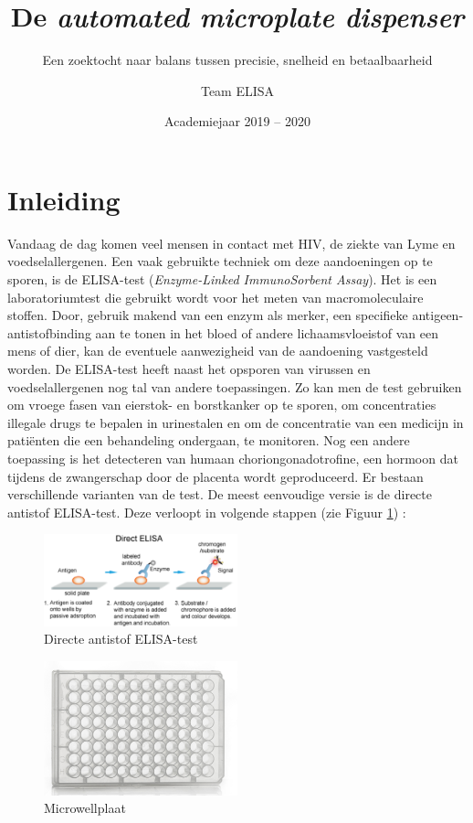 \documentclass[a4paper,twoside,kulak]{kulakreport} %
\title{De \textit{automated microplate dispenser}}
\subtitle{Een zoektocht naar balans tussen precisie, snelheid en betaalbaarheid}
\author{Team ELISA}
\institute{Matthias Derez, Maxime Dujardin, Korneel Verkens, Seppe Vilain}
\date{Academiejaar 2019 -- 2020}
\begin{document}

\titlepage

\tableofcontents

\chapter*{Inleiding}
Vandaag de dag komen veel mensen in contact met HIV, de ziekte van Lyme en voedselallergenen. Een vaak gebruikte techniek om deze aandoeningen op te sporen, is de ELISA-test\cite{wikipedia} (\textit{Enzyme-Linked ImmunoSorbent Assay}). Het is een laboratoriumtest die gebruikt wordt voor het meten van macromoleculaire stoffen. Door, gebruik makend van een enzym als merker, een specifieke antigeen-antistofbinding aan te tonen in het bloed of andere lichaamsvloeistof van een mens of dier, kan de eventuele aanwezigheid van de aandoening vastgesteld worden. De ELISA-test heeft naast het opsporen van virussen en voedselallergenen nog tal van andere toepassingen\cite{ELISAApplications}. Zo kan men de test gebruiken om vroege fasen van eierstok- en borstkanker op te sporen, om concentraties illegale drugs te bepalen in urinestalen en om de concentratie van een medicijn in patiënten die een behandeling ondergaan, te monitoren. Nog een andere toepassing is het detecteren van humaan choriongonadotrofine, een hormoon dat tijdens de zwangerschap door de placenta wordt geproduceerd\cite{HumanChorionicGonadotropin}. \newline
Er bestaan verschillende varianten van de test. De meest eenvoudige versie is de directe antistof ELISA-test. Deze verloopt in volgende stappen (zie Figuur \ref{fig: directe ELISA}) \cite{AfbeeldingdirectELISA}:

\begin{figure}[h]
	\centering
	\includegraphics[width=0.5\textwidth]{ELISA.png}
	\caption{Directe antistof ELISA-test}
	\label{fig: directe ELISA}
	
\end{figure} 


\begin{figure}[h]
	\centering
	\includegraphics[width=0.5\textwidth]{microplate.png}
	\caption{Microwellplaat}
	\label{fig: microwellplaat}
	
\end{figure} 
\end{document}
